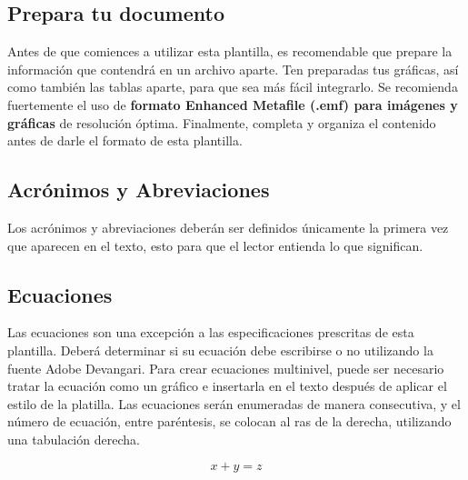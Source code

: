         
        \label{anexo:manualEnsambleEléctrico.pdf}
        
        
        
        
        
        \subsection{Prepara tu documento}
        
        Antes de que comiences a utilizar esta plantilla, es recomendable que prepare la información que contendrá en un archivo aparte. 
        Ten preparadas tus gráficas, así como también las tablas aparte, para que sea más fácil integrarlo. 
        Se recomienda fuertemente el uso de \textbf{formato Enhanced Metafile (.emf) para imágenes y gráficas} de resolución óptima. 
        Finalmente, completa y organiza el contenido antes de darle el formato de esta plantilla. 
        
        \subsection{Acrónimos y Abreviaciones}
        
        Los acrónimos y abreviaciones deberán ser definidos únicamente la primera vez que aparecen en el texto, esto para que el lector entienda lo que significan.
        
        \subsection{Ecuaciones}
        
        Las ecuaciones son una excepción a las especificaciones prescritas de esta plantilla. 
        Deberá determinar si su ecuación debe escribirse o no utilizando la fuente Adobe Devangari. 
        Para crear ecuaciones multinivel, puede ser necesario tratar la ecuación como un gráfico e insertarla en el texto después de aplicar el estilo de la platilla.
        Las ecuaciones serán enumeradas de manera consecutiva, y el número de ecuación, entre paréntesis, se colocan al ras de la derecha, utilizando una tabulación derecha. 
        
        \begin{equation}
            \label{eq1}
            x + y = z 
        \end{equation}
        
